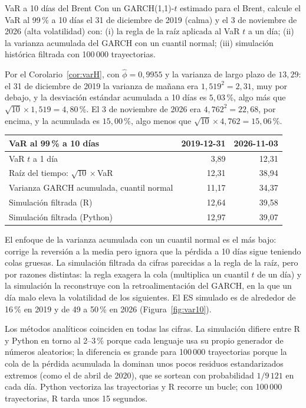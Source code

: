 \begin{ejresuelto}{VaR a 10 días del Brent}\label{ej:var10}
\enunciado Con un GARCH(1,1)-$t$ estimado para el Brent, calcule el VaR al 99\,\% a 10 días el 31 de diciembre de 2019 (calma)
y el 3 de noviembre de 2026 (alta volatilidad) con: (i) la regla de la raíz aplicada al VaR $t$ a un día; (ii) la
varianza acumulada del GARCH con un cuantil normal; (iii) simulación histórica filtrada con 100\,000 trayectorias.

\solucion
{} Por el Corolario~\ref{cor:varH}, con $\hat\phi=0{,}9955$ y la varianza de largo
plazo de $13{,}29$: el 31 de diciembre de 2019 la varianza de mañana era $1{,}519^2=2{,}31$, muy por debajo, y la
desviación estándar acumulada a 10 días es $5{,}03$\,\%, algo más que $\sqrt{10}\times1{,}519=4{,}80$\,\%. El 3 de noviembre
de 2026 era $4{,}762^2=22{,}68$, por encima, y la acumulada es $15{,}00$\,\%, algo menos que $\sqrt{10}\times4{,}762=15{,}06$\,\%.

\begin{center}\small
\begin{tabular}{@{}lrr@{}}
\toprule
VaR al 99\,\% a 10 días & 2019-12-31 & 2026-11-03 \\
\midrule
VaR $t$ a 1 día & 3,89 & 12,31 \\
Raíz del tiempo: $\sqrt{10}\times$VaR & 12,31 & 38,94 \\
Varianza GARCH acumulada, cuantil normal & 11,17 & 34,37 \\
Simulación filtrada (R) & 12,64 & 39,58 \\
Simulación filtrada (Python) & 12,97 & 39,07 \\
\bottomrule
\end{tabular}
\end{center}
El enfoque de la varianza acumulada con un cuantil normal es el más bajo: corrige la reversión a la media pero ignora
que la pérdida a 10 días sigue teniendo colas gruesas. La simulación filtrada da cifras parecidas a la regla de la raíz,
pero por razones distintas: la regla exagera la cola (multiplica un cuantil $t$ de un día) y la simulación la
reconstruye con la retroalimentación del GARCH, en la que un día malo eleva la volatilidad de los siguientes. El ES
simulado es de alrededor de 16\,\% en 2019 y de 49 a 50\,\% en 2026 (Figura~\ref{fig:var10}).


\RvsPy Los métodos analíticos coinciden en todas las cifras. La simulación difiere entre R y Python en torno al 2--3\,\%
porque cada lenguaje usa su propio generador de números aleatorios; la diferencia es grande para 100\,000
trayectorias porque la cola de la pérdida acumulada la dominan unos pocos residuos estandarizados extremos (como el
de abril de 2020), que se sortean con probabilidad $1/9\,121$ en cada día. Python vectoriza las trayectorias y R
recorre un bucle; con 100\,000 trayectorias, R tarda unos 15 segundos.


\end{ejresuelto}
